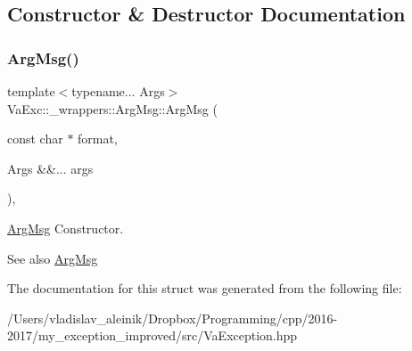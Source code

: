 \subsection{Constructor \& Destructor Documentation}
\mbox{\label{struct_va_exc_1_1__wrappers_1_1_arg_msg_ad7bb2c449c64e2ea7fb38cff28075705}} 
\subsubsection{\texorpdfstring{Arg\+Msg()}{ArgMsg()}}
{\footnotesize\ttfamily template$<$typename... Args$>$ \\
Va\+Exc\+::\+\_\+wrappers\+::\+Arg\+Msg\+::\+Arg\+Msg (\begin{DoxyParamCaption}\item[{const char $\ast$}]{format,  }\item[{Args \&\&...}]{args }\end{DoxyParamCaption})\hspace{0.3cm}{\ttfamily [inline]}, {\ttfamily [noexcept]}}



\hyperlink{struct_va_exc_1_1__wrappers_1_1_arg_msg}{Arg\+Msg} Constructor. 

\begin{DoxySeeAlso}{See also}
\hyperlink{struct_va_exc_1_1__wrappers_1_1_arg_msg}{Arg\+Msg} 
\end{DoxySeeAlso}


The documentation for this struct was generated from the following file\+:\begin{DoxyCompactItemize}
\item 
/\+Users/vladislav\+\_\+aleinik/\+Dropbox/\+Programming/cpp/2016-\/2017/my\+\_\+exception\+\_\+improved/src/Va\+Exception.\+hpp\end{DoxyCompactItemize}
